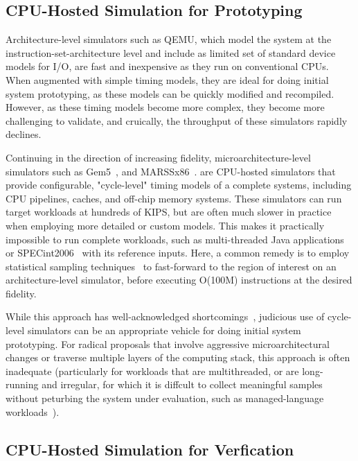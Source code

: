 \subsection{CPU-Hosted Simulation for Prototyping}

Architecture-level simulators such as QEMU\cite{qemu}, which model the system at the
instruction-set-architecture level and include as limited set of standard
device models for I/O, are fast and inexpensive as they run on conventional CPUs.
When augmented with simple timing models, they are ideal for doing initial system prototyping, as
these models can be quickly modified and recompiled.
However, as these timing models become more complex, they become more
challenging to validate, and cruically, the throughput of these simulators rapidly declines.

Continuing in the direction of increasing fidelity, microarchitecture-level
simulators such as Gem5~\cite{gem5}, and MARSSx86~\cite{marssx86}. are CPU-hosted 
simulators that provide configurable, "cycle-level" timing models of a complete systems, including CPU pipelines,
caches, and off-chip memory systems.  These simulators can run target workloads at hundreds of KIPS, but are
often much slower in practice when employing more detailed or custom models. This
makes it practically impossible to run complete workloads, such as
multi-threaded Java applications or SPECint2006~\cite{spec} with its reference
inputs. Here, a common remedy is to employ statistical sampling
techniques~\cite{smarts} to fast-forward to the region of interest on an architecture-level simulator, before
executing O(100M) instructions at the desired fidelity.

While this approach has well-acknowledged shortcomings~\cite{gem5error},
judicious use of cycle-level simulators can be an appropriate vehicle for
doing initial system prototyping. For radical proposals that involve
aggressive microarchitectural changes or traverse multiple layers of the
computing stack, this approach is often inadequate (particularly for workloads that
are multithreaded, or are long-running and irregular, for which it is diffcult to collect 
meaningful samples without peturbing the system under evaluation, such as
managed-language workloads~\cite{MicroSimPanel}).


\subsection{CPU-Hosted Simulation for Verfication}

